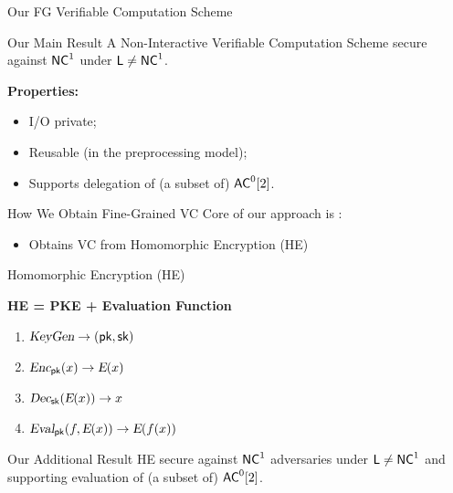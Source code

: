 \begin{frame}{Our FG Verifiable Computation Scheme}

\begin{block}{Our Main Result}
	A Non-Interactive Verifiable Computation Scheme secure against ${\mathsf{NC}}^1$ under ${\mathsf{L}} \not = {\mathsf{NC}}^1$.
\end{block}
\pause
\textbf{Properties:}
\begin{itemize}[<+- | alert@+>]
	\item I/O private;
	\item Reusable (in the preprocessing model);
	\item Supports delegation of (a subset of) ${\mathsf{AC}}^0[2]$.
\end{itemize}
\end{frame}


\begin{frame}{How We Obtain Fine-Grained VC}
	Core of our approach is \cite{ckv10}:
	\begin{itemize}
		\item  Obtains VC from Homomorphic Encryption (HE)
	\end{itemize}
\end{frame}

\def\E{\func{E}}

\begin{frame}{Homomorphic Encryption (HE)}
	\begin{center} \textbf{HE = PKE + Evaluation Function} \end{center}
	\pause
	\begin{enumerate}
		\item ${\textsl{KeyGen}} \to (\mathsf{pk}, \mathsf{sk})$
		\item $\func{Enc}_{\pk}(x) \to \E(x)$
		\item $\func{Dec}_{\sk}(\E(x)) \to x$
		\pause  
		\item $\func{Eval}_{\pk}(f, \E(x)) \to \E(f(x))$
	\end{enumerate}
	\pause
	\bigskip
	\begin{block}{Our Additional Result}
		HE secure against ${\mathsf{NC}}^1$ adversaries under ${\mathsf{L}} \not = {\mathsf{NC}}^1$ and supporting evaluation of (a subset of) ${\mathsf{AC}}^0[2]$.
	\end{block}
\end{frame}

